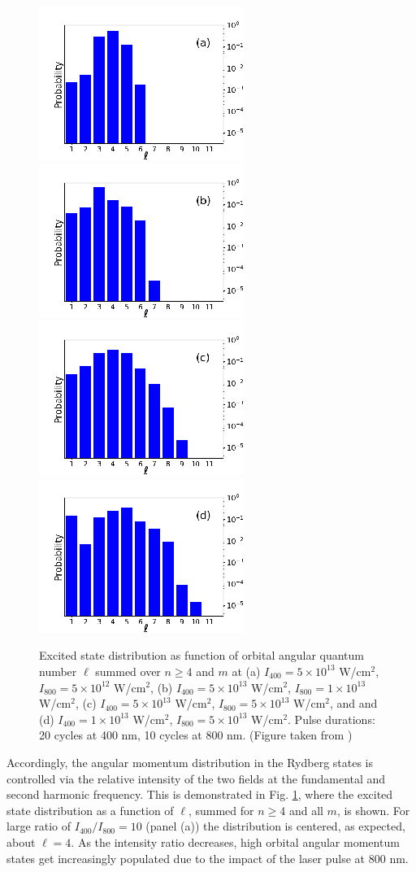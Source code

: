 \begin{figure}[!ht]
\centering
\includegraphics[width=0.24\columnwidth]{figs/Rydberg/Gebre-bicircular-Fig3a.png}
\includegraphics[width=0.24\columnwidth]{figs/Rydberg/Gebre-bicircular-Fig3b.png}
\includegraphics[width=0.24\columnwidth]{figs/Rydberg/Gebre-bicircular-Fig3c.png}
\includegraphics[width=0.24\columnwidth]{figs/Rydberg/Gebre-bicircular-Fig3d.png}
\caption{\label{fig:l-distribution}
Excited state distribution as function of orbital angular quantum number $\ell$ summed over $n \ge 4$ and $m$ at 
(a) $I_{400} = 5 \times 10^{13}$ W/cm$^2$, $I_{800} = 5 \times 10^{12}$ W/cm$^2$, 
(b) $I_{400} = 5 \times 10^{13}$ W/cm$^2$, $I_{800} = 1 \times 10^{13}$ W/cm$^2$, 
(c) $I_{400} = 5 \times 10^{13}$ W/cm$^2$, $I_{800} = 5 \times 10^{13}$ W/cm$^2$, and
and (d) $I_{400} = 1 \times 10^{13}$ W/cm$^2$, $I_{800} = 5 \times 10^{13}$ W/cm$^2$. Pulse durations: 20 cycles at 400 nm, 10 cycles at 800 nm. (Figure taken from \cite{venzke2020_ryd})
}
\end{figure}

Accordingly, the angular momentum distribution in the Rydberg states is controlled via the relative intensity of the two fields at the fundamental and second harmonic frequency. This is demonstrated in Fig. \ref{fig:l-distribution}, where the excited state distribution as a function of $\ell$, summed for $n \ge 4$ and all $m$, is shown. For large ratio of $I_{400}/I_{800} = 10$ (panel (a)) the distribution is centered, as expected, about $\ell = 4$. As the intensity ratio decreases, high orbital angular momentum states get increasingly populated due to the impact of the laser pulse at 800 nm. 

